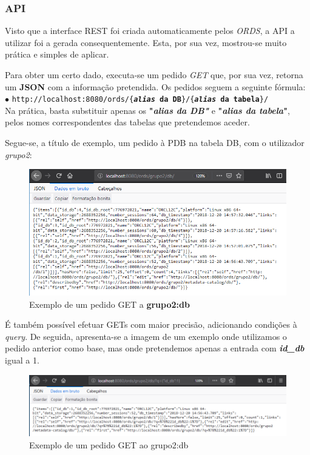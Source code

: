 \documentclass[a4paper]{article}
\begin{document}
\subsubsection{API}
\hspace{3mm} 

Visto que a interface REST foi criada automaticamente pelos \emph{ORDS}, a API a utilizar foi a gerada consequentemente. Esta, por sua vez, mostrou-se muito prática e simples de aplicar.

Para obter um certo dado, executa-se um pedido \emph{GET} que, por sua vez, retorna um \textbf{JSON} com a informação pretendida.
Os pedidos seguem a seguinte fórmula:\\

$\bullet$ \texttt{http://localhost:8080/ords/\{\textbf{\emph{alias} da DB}\}/\{\textbf{\emph{alias} da tabela}\}/}\\

Na prática, basta substituir apenas os \textbf{"\emph{alias da DB"}} e \textbf{"\emph{alias da tabela}"}, pelos nomes correspondentes das tabelas que pretendemos aceder.

Segue-se, a título de exemplo, um pedido à PDB na tabela DB, com o utilizador \emph{grupo2}:

\begin{figure}[H]
\centering
\includegraphics[scale=0.70]{REST/api_1.png}
\caption{Exemplo de um pedido GET a \textbf{grupo2:db}}
\end{figure}

É também possível efetuar GETs com maior precisão, adicionando condições à \emph{query}.
De seguida, apresenta-se a imagem de um exemplo onde utilizamos o pedido anterior como base, mas onde pretendemos apenas a entrada com \textbf{\emph{id\_db}} igual a 1.

\begin{figure}[H]
\centering
\includegraphics[scale=0.6]{REST/api_2.png}
\caption{Exemplo de um pedido GET ao grupo2:db}
\end{figure}
\end{document}
